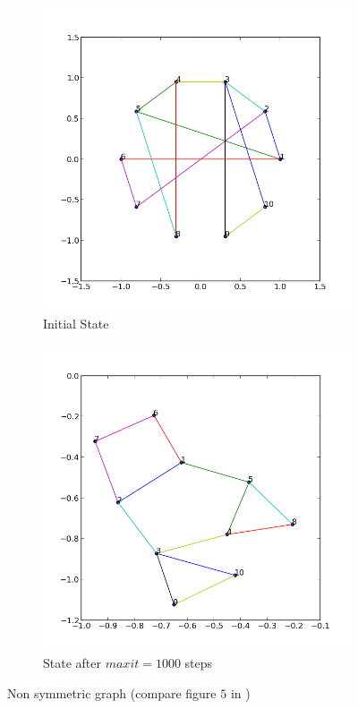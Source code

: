\documentclass[12pt,a4paper]{article}
\begin{document}
\begin{figure}[htb]
	 \begin{subfigure}{0.5\textwidth}
		   \centering
           \includegraphics[scale=0.45]{results_Kawai/ex3_before}
           \caption{Initial State}
     \end{subfigure}
	 \begin{subfigure}{0.5\textwidth}
			\centering
           \includegraphics[scale=0.45]{results_Kawai/ex3_after}
            \caption{State after $maxit=1000$ steps}
     \end{subfigure}
     \caption{Non symmetric graph (compare figure $5$ in \cite{TomihisaKamada1989})}
     \label{fig: nonsym}
\end{figure}    
\end{document}
